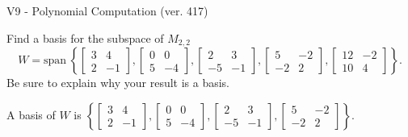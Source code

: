 \begin{exercise}
  \begin{exerciseTitle}V9 - Polynomial Computation (ver. 417)\end{exerciseTitle}
  \begin{exerciseStatement}
    Find a basis for the subspace of \(M_{2,2}\) 
\[W=\mathrm{span}\ \left\{\left[\begin{array}{cc}
3 & 4 \\
2 & -1
\end{array}\right] , \left[\begin{array}{cc}
0 & 0 \\
5 & -4
\end{array}\right] , \left[\begin{array}{cc}
2 & 3 \\
-5 & -1
\end{array}\right] , \left[\begin{array}{cc}
5 & -2 \\
-2 & 2
\end{array}\right] , \left[\begin{array}{cc}
12 & -2 \\
10 & 4
\end{array}\right]\right\}.\]
 Be sure to explain why your result is a basis.


  \end{exerciseStatement}
  \begin{exerciseAnswer}
   A basis of \(W\) is  \(\left\{\left[\begin{array}{cc}
3 & 4 \\
2 & -1
\end{array}\right] , \left[\begin{array}{cc}
0 & 0 \\
5 & -4
\end{array}\right] , \left[\begin{array}{cc}
2 & 3 \\
-5 & -1
\end{array}\right] , \left[\begin{array}{cc}
5 & -2 \\
-2 & 2
\end{array}\right]\right\}\).
  


  \end{exerciseAnswer}
\end{exercise}